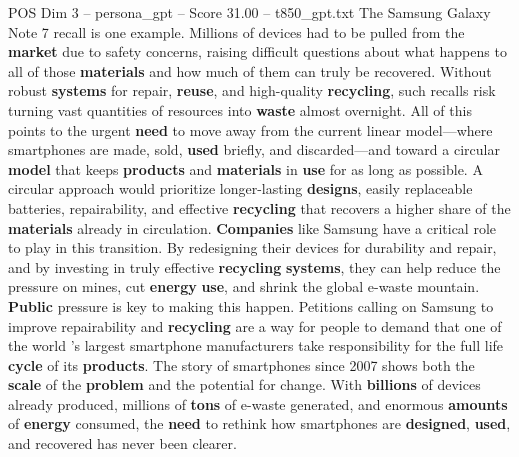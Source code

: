 \begin{textsample}{POS Dim 3 – persona\_gpt – Score 31.00 – t850\_gpt.txt}
The Samsung Galaxy Note 7 recall is one example.
Millions of devices had to be pulled from the \textbf{market} due to safety concerns, raising difficult questions about what happens to all of those \textbf{materials} and how much of them can truly be recovered.
Without robust \textbf{systems} for repair, \textbf{reuse}, and high-quality \textbf{recycling}, such recalls risk turning vast quantities of resources into \textbf{waste} almost overnight.
All of this points to the urgent \textbf{need} to move away from the current linear model—where smartphones are made, sold, \textbf{used} briefly, and discarded—and toward a circular \textbf{model} that keeps \textbf{products} and \textbf{materials} in \textbf{use} for as long as possible.
A circular approach would prioritize longer-lasting \textbf{designs}, easily replaceable batteries, repairability, and effective \textbf{recycling} that recovers a higher share of the \textbf{materials} already in circulation. \textbf{Companies} like Samsung have a critical role to play in this transition.
By redesigning their devices for durability and repair, and by investing in truly effective \textbf{recycling} \textbf{systems}, they can help reduce the pressure on mines, cut \textbf{energy} \textbf{use}, and shrink the global e-waste mountain. \textbf{Public} pressure is key to making this happen.
Petitions calling on Samsung to improve repairability and \textbf{recycling} are a way for people to demand that one of the world ’s largest smartphone manufacturers take responsibility for the full life \textbf{cycle} of its \textbf{products}.
The story of smartphones since 2007 shows both the \textbf{scale} of the \textbf{problem} and the potential for change.
With \textbf{billions} of devices already produced, millions of \textbf{tons} of e-waste generated, and enormous \textbf{amounts} of \textbf{energy} consumed, the \textbf{need} to rethink how smartphones are \textbf{designed}, \textbf{used}, and recovered has never been clearer.

\end{textsample}
